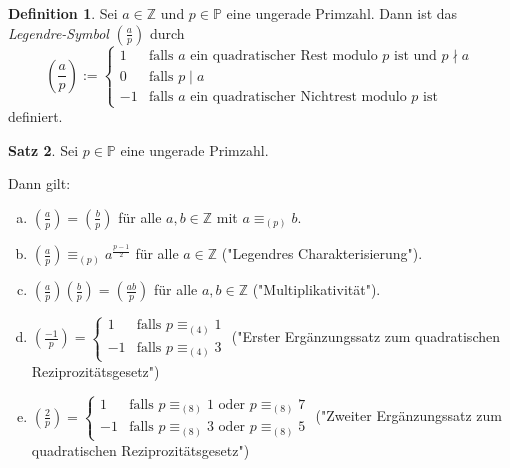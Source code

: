 \documentclass[
twoside=semi,
fontsize=12,
DIV=12, 
cleardoublepage=current,
leqno,
headings=optiontoheadandtoc, 
toc=idx
]{scrbook}
\newcommand{\Z}{\mathbb{Z}}
\renewcommand{\P}{\mathbb{P}}
\newcommand{\brac}[1]{\left( #1 \right)}
\newcommand{\legendre}[2]{\brac{\frac{#1}{#2}}}
\theoremstyle{definition}
\newtheorem{definition}{Definition}[section]
\newtheorem{satz}[definition]{Satz}
\begin{document}
 	\begin{definition}\label{4.3.2}\hfill\newline
 		Sei $a \in \Z$ und $p \in \P$ eine ungerade Primzahl. Dann ist das \emph{Legendre-Symbol} $\displaystyle\legendre{a}{p}$ durch
 			\[\legendre{a}{p} := 
 			\begin{cases}
 				1 & \textrm{falls } a \textrm{ ein quadratischer Rest modulo } p \textrm{ ist und } p \nmid a\\
 				0 & \textrm{falls } p \mid a\\
 				-1& \textrm{falls } a \textrm{ ein quadratischer Nichtrest modulo } p \textrm{ ist}
 			\end{cases}\]
 		definiert.
 	\end{definition}
 
 	\begin{satz}\label{4.3.3}\hfill\newline
 		Sei $p \in \P$ eine ungerade Primzahl.
 		
 		\medskip\noindent
 		Dann gilt:
 		\begin{enumerate}[(a)]
 			\item $\displaystyle \legendre{a}{p} = \legendre{b}{p}$ f\"ur alle $a, b \in \Z$ mit $a \equiv_{(p)} b$.
 			\item $\displaystyle \legendre{a}{p} \equiv_{(p)} a^{\frac{p-1}{2}}$ f\"ur alle $a \in \Z$ ("Legendres Charakterisierung").
 			\item $\displaystyle \legendre{a}{p}\legendre{b}{p} = \legendre{ab}{p}$ f\"ur alle $a, b \in \Z$ ("Multiplikativit\"at").
 			\item $\displaystyle \legendre{-1}{p} = 
 			\begin{cases}
 				1 & \textrm{falls } p \equiv_{(4)} 1\\
 				-1& \textrm{falls } p \equiv_{(4)} 3
 			\end{cases}$ \newline ("Erster Erg\"anzungssatz zum quadratischen Reziprozit\"atsgesetz")
 			\item $\displaystyle \legendre{2}{p} = 
 			\begin{cases}
 			1 & \textrm{falls } p \equiv_{(8)} 1 \textrm{ oder } p \equiv_{(8)} 7\\
 			-1& \textrm{falls } p \equiv_{(8)} 3 \textrm{ oder } p \equiv_{(8)} 5
 			\end{cases}$ \newline ("Zweiter Erg\"anzungssatz zum quadratischen Reziprozit\"atsgesetz")
 		\end{enumerate}
 	

\end{satz}
\end{document}
